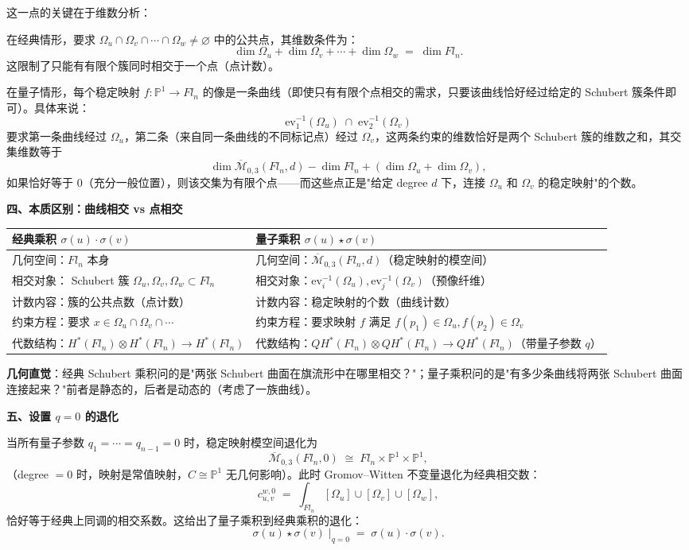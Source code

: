 这一点的关键在于维数分析：

在经典情形，要求 $\Omega_u \cap \Omega_v \cap \cdots \cap \Omega_w \neq \varnothing$ 中的公共点，其维数条件为：
$$\dim \Omega_u + \dim \Omega_v + \cdots + \dim \Omega_w \;=\; \dim Fl_n.$$
这限制了只能有有限个簇同时相交于一个点（点计数）。

在量子情形，每个稳定映射 $f: \mathbb{P}^1 \to Fl_n$ 的像是一条曲线（即使只有有限个点相交的需求，只要该曲线恰好经过给定的 Schubert 簇条件即可）。具体来说：
$$\mathrm{ev}_1^{-1}(\Omega_u) \;\cap\; \mathrm{ev}_2^{-1}(\Omega_v)$$
要求第一条曲线经过 $\Omega_u$，第二条（来自同一条曲线的不同标记点）经过 $\Omega_v$，这两条约束的维数恰好是两个 Schubert 簇的维数之和，其交集维数等于
$$\dim \overline{\mathcal{M}}_{0,3}(Fl_n, d) - \dim Fl_n + (\dim \Omega_u + \dim \Omega_v),$$
如果恰好等于 $0$（充分一般位置），则该交集为有限个点——而这些点正是"给定 degree $d$ 下，连接 $\Omega_u$ 和 $\Omega_v$ 的稳定映射"的个数。

\textbf{四、本质区别：曲线相交 vs 点相交}

\begin{center}
\begin{tabular}{p{6cm} | p{6cm}}
\textbf{经典乘积} $\sigma(u) \cdot \sigma(v)$ & \textbf{量子乘积} $\sigma(u) \star \sigma(v)$ \\
\hline
几何空间：$Fl_n$ 本身 & 几何空间：$\overline{\mathcal{M}}_{0,3}(Fl_n, d)$（稳定映射的模空间）\\
相交对象： Schubert 簇 $\Omega_u, \Omega_v, \Omega_w \subset Fl_n$ & 相交对象：$\mathrm{ev}_i^{-1}(\Omega_u), \mathrm{ev}_j^{-1}(\Omega_v)$（预像纤维）\\
计数内容：簇的公共点数（点计数） & 计数内容：稳定映射的个数（曲线计数）\\
约束方程：要求 $x \in \Omega_u \cap \Omega_v \cap \cdots$ & 约束方程：要求映射 $f$ 满足 $f(p_1) \in \Omega_u, f(p_2) \in \Omega_v$ \\
代数结构：$H^*(Fl_n) \otimes H^*(Fl_n) \to H^*(Fl_n)$ & 代数结构：$QH^*(Fl_n) \otimes QH^*(Fl_n) \to QH^*(Fl_n)$（带量子参数 $q$）\\
\end{tabular}
\end{center}

\textbf{几何直觉}：经典 Schubert 乘积问的是"两张 Schubert 曲面在旗流形中在哪里相交？"；量子乘积问的是"有多少条曲线将两张 Schubert 曲面连接起来？"前者是静态的，后者是动态的（考虑了一族曲线）。

\textbf{五、设置 $q = 0$ 的退化}

当所有量子参数 $q_1 = \cdots = q_{n-1} = 0$ 时，稳定映射模空间退化为
$$\overline{\mathcal{M}}_{0,3}(Fl_n, 0) \;\cong\; Fl_n \times \mathbb{P}^1 \times \mathbb{P}^1,$$
（degree $= 0$ 时，映射是常值映射，$C \cong \mathbb{P}^1$ 无几何影响）。此时 Gromov--Witten 不变量退化为经典相交数：
$$c_{u,v}^{w,0} \;=\; \int_{Fl_n} [\Omega_u] \cup [\Omega_v] \cup [\Omega_w],$$
恰好等于经典上同调的相交系数。这给出了量子乘积到经典乘积的退化：
$$\sigma(u) \star \sigma(v) \;\big|_{q=0} \;=\; \sigma(u) \cdot \sigma(v).$$

